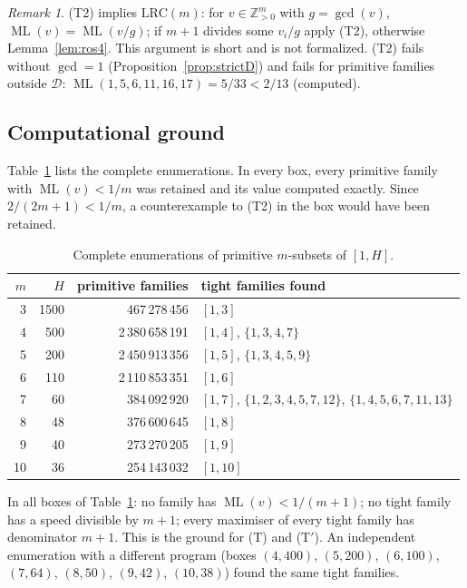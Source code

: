 \documentclass[11pt]{amsart}
\theoremstyle{plain}
\theoremstyle{definition}
\theoremstyle{remark}
\newtheorem{remark}[theorem]{Remark}
\newcommand{\ML}{\operatorname{ML}}
\newcommand{\Z}{\mathbb{Z}}
\newcommand{\LRC}{\mathrm{LRC}}
\begin{document}
\begin{remark}\label{rem:T2}
(T2) implies $\LRC(m)$: for $v\in\Z_{>0}^m$ with $g=\gcd(v)$, $\ML(v)=\ML(v/g)$; if $m+1$ divides
some $v_i/g$ apply (T2), otherwise Lemma~\ref{lem:ros4}. This argument is short and is not
formalized. (T2) fails without $\gcd=1$ (Proposition~\ref{prop:strictD}) and fails for primitive
families outside $\mathcal D$: $\ML(1,5,6,11,16,17)=5/33<2/13$ (computed).
\end{remark}

\subsection{Computational ground}
Table~\ref{tab:boxes} lists the complete enumerations. In every box, every primitive family with
$\ML(v)<1/m$ was retained and its value computed exactly. Since $2/(2m+1)<1/m$, a counterexample
to (T2) in the box would have been retained.

\begin{table}[h]
\centering
\begin{tabular}{rrrl}
\toprule
$m$ & $H$ & primitive families & tight families found\\
\midrule
3 & 1500 & 467\,278\,456 & $[1,3]$\\
4 & 500 & 2\,380\,658\,191 & $[1,4]$, $\{1,3,4,7\}$\\
5 & 200 & 2\,450\,913\,356 & $[1,5]$, $\{1,3,4,5,9\}$\\
6 & 110 & 2\,110\,853\,351 & $[1,6]$\\
7 & 60 & 384\,092\,920 & $[1,7]$, $\{1,2,3,4,5,7,12\}$, $\{1,4,5,6,7,11,13\}$\\
8 & 48 & 376\,600\,645 & $[1,8]$\\
9 & 40 & 273\,270\,205 & $[1,9]$\\
10 & 36 & 254\,143\,032 & $[1,10]$\\
\bottomrule
\end{tabular}
\caption{Complete enumerations of primitive $m$-subsets of $[1,H]$.}\label{tab:boxes}
\end{table}

In all boxes of Table~\ref{tab:boxes}: no family has $\ML(v)<1/(m+1)$; no tight family has a speed
divisible by $m+1$; every maximiser of every tight family has denominator $m+1$. This is the
ground for (T) and (T$'$). An independent enumeration with a different program (boxes
$(4,400)$, $(5,200)$, $(6,100)$, $(7,64)$, $(8,50)$, $(9,42)$, $(10,38)$) found the same tight
families.
\end{document}
